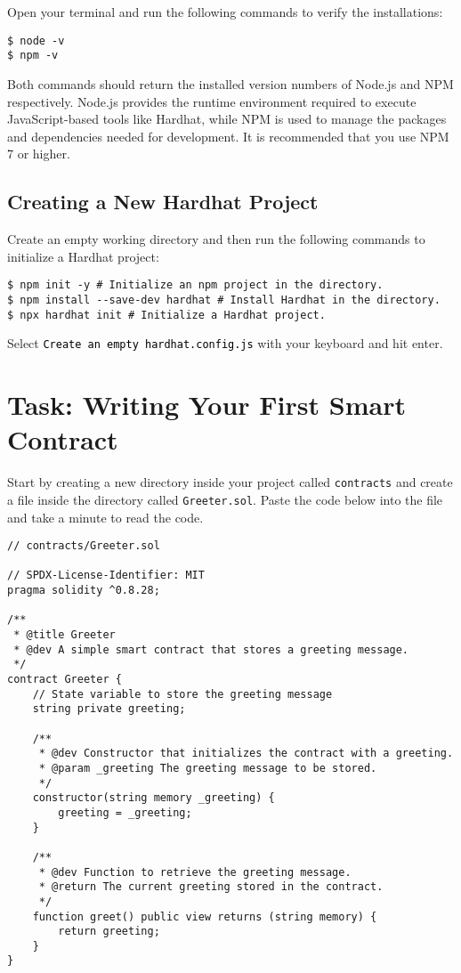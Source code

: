 \documentclass[12pt]{article}
\newcommand{\codegrey}[1]{%
  \texttt{\colorbox{black!4}{\textcolor{black}{#1}}}%
}
\begin{document}
Open your terminal and run the following commands to verify the installations:

\begin{verbatim}
$ node -v
$ npm -v
\end{verbatim}

Both commands should return the installed version numbers of Node.js and NPM respectively. Node.js provides the runtime environment required to execute JavaScript-based tools like Hardhat, while NPM is used to manage the packages and dependencies needed for development. It is recommended that you use NPM 7 or higher.

\subsection{Creating a New Hardhat Project}

Create an empty working directory and then run the following commands to initialize a Hardhat project:

\begin{verbatim}
$ npm init -y # Initialize an npm project in the directory.
$ npm install --save-dev hardhat # Install Hardhat in the directory.
$ npx hardhat init # Initialize a Hardhat project.
\end{verbatim}
Select \codegrey{Create an empty \texttt{hardhat.config.js}} with your keyboard and hit enter.

\section{Task: Writing Your First Smart Contract}

Start by creating a new directory inside your project called \texttt{contracts} and create a file inside the directory called \texttt{Greeter.sol}. Paste the code below into the file and take a minute to read the code.

\begin{verbatim}
// contracts/Greeter.sol

// SPDX-License-Identifier: MIT
pragma solidity ^0.8.28;

/**
 * @title Greeter
 * @dev A simple smart contract that stores a greeting message.
 */
contract Greeter {
    // State variable to store the greeting message
    string private greeting;

    /**
     * @dev Constructor that initializes the contract with a greeting.
     * @param _greeting The greeting message to be stored.
     */
    constructor(string memory _greeting) {
        greeting = _greeting;
    }

    /**
     * @dev Function to retrieve the greeting message.
     * @return The current greeting stored in the contract.
     */
    function greet() public view returns (string memory) {
        return greeting;
    }
}
\end{verbatim}
\end{document}
